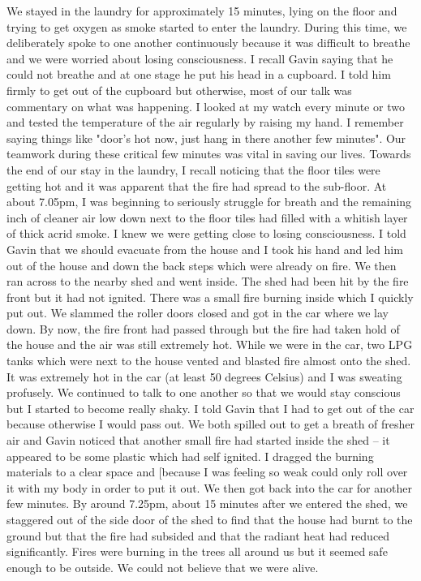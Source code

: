 \documentclass[a4paper]{article}
\begin{document}
        We stayed in the laundry for approximately 15 minutes, lying on the floor and trying to get oxygen as smoke started to enter the laundry. During this time, we deliberately spoke to one another continuously because it was difficult to breathe and we were worried about losing consciousness. I recall Gavin saying that he could not breathe and at one stage he put his head in a cupboard. I told him firmly to get out of the cupboard but otherwise, most of our talk was commentary on what was happening. I looked at my watch every minute or two and tested the temperature of the air regularly by raising my hand. I remember saying things like "door's hot now, just hang in there another few minutes". Our teamwork during these critical few minutes was vital in saving our lives.
        Towards the end of our stay in the laundry, I recall noticing that the floor tiles were getting hot and it was apparent that the fire had spread to the sub-floor. At about 7.05pm, I was beginning to seriously struggle for breath and the remaining inch of cleaner air low down next to the floor tiles had filled with a whitish layer of thick acrid smoke. I knew we were getting close to losing consciousness. I told Gavin that we should evacuate from the house and I took his hand and led him out of the house and down the back steps which were already on fire. We then ran across to the nearby shed and went inside. The shed had been hit by the fire front but it had not ignited. There was a small fire burning inside which I quickly put out. We slammed the roller doors closed and got in the car where we lay down. By now, the fire front had passed through but the fire had taken hold of the house and the air was still extremely hot.
        While we were in the car, two LPG tanks which were next to the house vented and blasted fire almost onto the shed. It was extremely hot in the car (at least 50 degrees Celsius) and I was sweating profusely. We continued to talk to one another so that we would stay conscious but I started to become really shaky. I told Gavin that I had to get out of the car because otherwise I would pass out. We both spilled out to get a breath of fresher air and Gavin noticed that another small fire had started inside the shed – it appeared to be some plastic which had self ignited. I dragged the burning materials to a clear space and [because I was feeling so weak could only roll over it with my body in order to put it out. We then got back into the car for another few minutes.
        By around 7.25pm, about 15 minutes after we entered the shed, we staggered out of the side door of the shed to find that the house had burnt to the ground but that the fire had subsided and that the radiant heat had reduced significantly. Fires were burning in the trees all around us but it seemed safe enough to be outside. We could not believe that we were alive.
\end{document}

